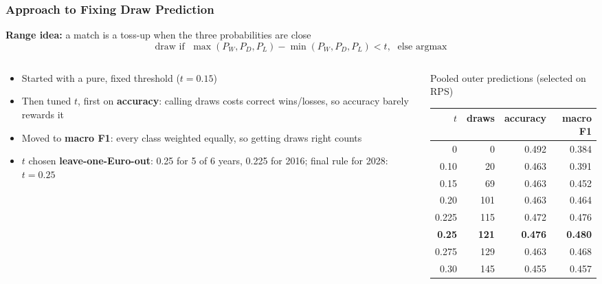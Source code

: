 \documentclass[aspectratio=1610, 9pt]{beamer}
\begin{document}
\begin{frame}
  \frametitle{Approach to Fixing Draw Prediction}

  \small
  \textbf{Range idea:} a match is a toss-up when the three probabilities are close
  \[
    \text{draw if }\; \max(P_W, P_D, P_L) - \min(P_W, P_D, P_L) < t,
    \;\text{ else argmax}
  \]

  \vspace{-0.6em}
  \begin{columns}[T]
    \begin{column}{0.52\textwidth}
      \begin{itemize}
        \footnotesize
        \item Started with a pure, fixed threshold ($t = 0.15$)
        \item Then tuned $t$, first on \textbf{accuracy}: calling draws costs
              correct wins/losses, so accuracy barely rewards it
        \item Moved to \textbf{macro F1}: every class weighted equally,
              so getting draws right counts
        \item $t$ chosen \textbf{leave-one-Euro-out}: 0.25 for 5 of 6 years,
              0.225 for 2016; final rule for 2028: $t = 0.25$
      \end{itemize}
    \end{column}

    \begin{column}{0.44\textwidth}
      \centering
      \footnotesize
      Pooled outer predictions (selected on RPS)

      \vspace{0.3em}
      \begin{tabular}{rrrr}
        \toprule
        $t$ & draws & accuracy & macro F1 \\
        \midrule
        0     &   0 & 0.492 & 0.384 \\
        0.10  &  20 & 0.463 & 0.391 \\
        0.15  &  69 & 0.463 & 0.452 \\
        0.20  & 101 & 0.463 & 0.464 \\
        0.225 & 115 & 0.472 & 0.476 \\
        \textbf{0.25} & \textbf{121} & \textbf{0.476} & \textbf{0.480} \\
        0.275 & 129 & 0.463 & 0.468 \\
        0.30  & 145 & 0.455 & 0.457 \\
        \bottomrule
      \end{tabular}
    \end{column}
  \end{columns}

\end{frame}
\end{document}

